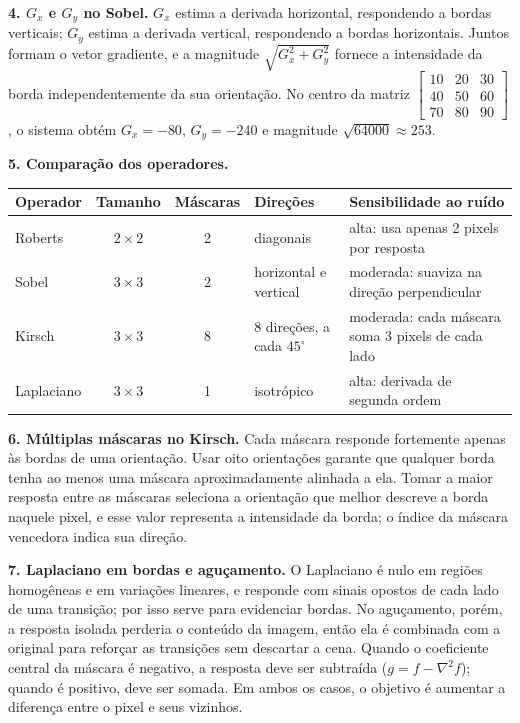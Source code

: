 \documentclass[11pt,a4paper]{article}
\begin{document}
\textbf{4. $G_x$ e $G_y$ no Sobel.} $G_x$ estima a derivada horizontal, respondendo a bordas verticais; $G_y$ estima a derivada vertical, respondendo a bordas horizontais. Juntos formam o vetor gradiente, e a magnitude $\sqrt{G_x^2+G_y^2}$ fornece a intensidade da borda independentemente da sua orientação. No centro da matriz $\left[\begin{smallmatrix}10&20&30\\40&50&60\\70&80&90\end{smallmatrix}\right]$, o sistema obtém $G_x=-80$, $G_y=-240$ e magnitude $\sqrt{64000}\approx253$.

\textbf{5. Comparação dos operadores.}

\begin{table}[H]
\centering
\small
\begin{tabularx}{\textwidth}{lccXX}
\toprule
Operador & Tamanho & Máscaras & Direções & Sensibilidade ao ruído\\
\midrule
Roberts & $2\times2$ & 2 & diagonais & alta: usa apenas 2 pixels por resposta\\
Sobel & $3\times3$ & 2 & horizontal e vertical & moderada: suaviza na direção perpendicular\\
Kirsch & $3\times3$ & 8 & 8 direções, a cada $45^\circ$ & moderada: cada máscara soma 3 pixels de cada lado\\
Laplaciano & $3\times3$ & 1 & isotrópico & alta: derivada de segunda ordem\\
\bottomrule
\end{tabularx}
\end{table}

\textbf{6. Múltiplas máscaras no Kirsch.} Cada máscara responde fortemente apenas às bordas de uma orientação. Usar oito orientações garante que qualquer borda tenha ao menos uma máscara aproximadamente alinhada a ela. Tomar a maior resposta entre as máscaras seleciona a orientação que melhor descreve a borda naquele pixel, e esse valor representa a intensidade da borda; o índice da máscara vencedora indica sua direção.

\textbf{7. Laplaciano em bordas e aguçamento.} O Laplaciano é nulo em regiões homogêneas e em variações lineares, e responde com sinais opostos de cada lado de uma transição; por isso serve para evidenciar bordas. No aguçamento, porém, a resposta isolada perderia o conteúdo da imagem, então ela é combinada com a original para reforçar as transições sem descartar a cena. Quando o coeficiente central da máscara é negativo, a resposta deve ser subtraída ($g = f-\nabla^2 f$); quando é positivo, deve ser somada. Em ambos os casos, o objetivo é aumentar a diferença entre o pixel e seus vizinhos.
\end{document}
